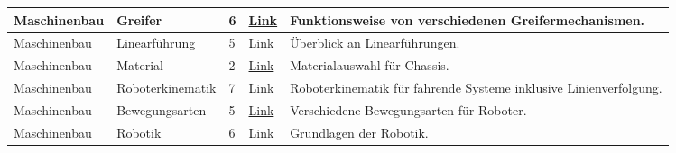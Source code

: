 \documentclass[../main.tex]{subfiles}
\begin{document}
\begin{longtable}{@{} L{2.5cm} L{2.9cm} C{1cm} L{1.2cm} L{6cm} @{}}
Maschinenbau & Greifer & 6 & \href{https://automationspraxis.industrie.de/handling/greifer-fuer-roboter-grundlagen-funktion-und-hersteller/}{Link} & Funktionsweise von verschiedenen Greifermechanismen. \\
\hline
Maschinenbau & Linearführung & 5 & \href{https://blog.item24.com/automatisierte-produktion/mit-lineartechnik-automation-einfach-umsetzen/}{Link} & Überblick an Linearführungen. \\
\hline
Maschinenbau & Material & 2 & \href{https://www.evsint.com/de/materials-to-build-a-robot/}{Link} & Materialauswahl für Chassis. \\
\hline
Maschinenbau & Roboterkinematik & 7 & \href{https://www-home.htwg-konstanz.de/\~{}bittel/msi\_robo/Vorlesung/02\_Roboterkinematik.pdf}{Link} & Roboterkinematik für fahrende Systeme inklusive Linienverfolgung. \\
\hline
Maschinenbau & Bewegungsarten & 5 & \href{https://www.scinexx.de/dossierartikel/rollen-oder-laufen/}{Link} & Verschiedene Bewegungsarten für Roboter. \\
\hline
Maschinenbau & Robotik & 6 & \href{https://www.hs-koblenz.de/fileadmin/media/profiles/ingenieurwesen\_elektrotechnik\_und\_informationstechnik/ross/ROB/Material/handout.pdf}{Link} & Grundlagen der Robotik. \\
\end{longtable}
\end{document}
